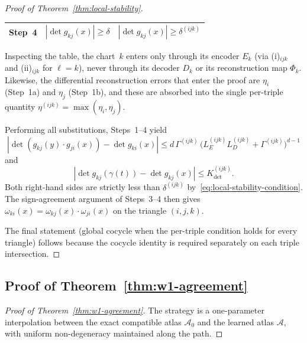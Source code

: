 \documentclass[11pt]{article}
\theoremstyle{plain}
\theoremstyle{definition}
\theoremstyle{remark}
\begin{document}
\begin{appendices}
\begin{proof}[Proof of Theorem~\ref{thm:local-stability}]
\begin{center}
\begin{tabularx}{\textwidth}{lXX}
Step~4 & $|\det g_{kj}(x)| \geq \delta$ 
& $|\det g_{kj}(x)| \geq \delta^{(ijk)}$ \\
\bottomrule
\end{tabularx}
\end{center}

Inspecting the table, the chart~$k$ enters only through its encoder $E_k$ (via (i)$_{ijk}$ and (ii)$_{ijk}$ for $\ell = k$), never through its decoder $D_k$ or its reconstruction map $\Phi_k$. Likewise, the differential reconstruction errors that enter the proof are $\eta_i$ (Step~1a) and $\eta_j$ (Step~1b), and these are absorbed into the single per-triple quantity $\eta^{(ijk)} = \max(\eta_i, \eta_j)$.

Performing all substitutions, Steps~1--4 yield
\[
|\det(g_{kj}(y) \cdot g_{ji}(x)) - \det g_{ki}(x)| \leq d\,\Gamma^{(ijk)}\,\bigl(L_E^{(ijk)} L_D^{(ijk)} + \Gamma^{(ijk)}\bigr)^{d-1}
\]
and
\[
|\det g_{kj}(\gamma(t)) - \det g_{kj}(x)| \leq K_{\det}^{(ijk)}.
\]
Both right-hand sides are strictly less than $\delta^{(ijk)}$ by~\eqref{eq:local-stability-condition}. The sign-agreement argument of Steps~3--4 then gives $\omega_{ki}(x) = \omega_{kj}(x) \cdot \omega_{ji}(x)$ on the triangle $(i, j, k)$.

The final statement (global cocycle when the per-triple condition holds for every triangle) follows because the cocycle identity is required separately on each triple intersection.
\end{proof}

\subsection{Proof of Theorem~\ref{thm:w1-agreement}}\label{proof:agreement}

\begin{proof}[Proof of Theorem~\ref{thm:w1-agreement}]
The strategy is a one-parameter interpolation between the exact compatible atlas $\mathcal{A}_0$ and the learned atlas $\mathcal{A}$, with uniform non-degeneracy maintained along the path.


\end{proof}
\end{appendices}
\end{document}
